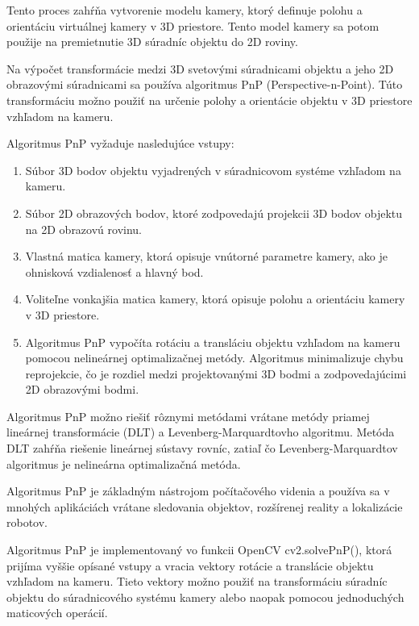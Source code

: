 {Tento proces zahŕňa vytvorenie modelu kamery, ktorý definuje polohu a orientáciu virtuálnej kamery v 3D priestore. Tento model kamery sa potom použije na premietnutie 3D súradníc objektu do 2D roviny.

Na výpočet transformácie medzi 3D svetovými súradnicami objektu a jeho 2D obrazovými súradnicami sa používa algoritmus PnP (Perspective-n-Point). Túto transformáciu možno použiť na určenie polohy a orientácie objektu v 3D priestore vzhľadom na kameru.

Algoritmus PnP vyžaduje nasledujúce vstupy:
\begin{enumerate}
\item Súbor 3D bodov objektu vyjadrených v súradnicovom systéme vzhľadom na kameru.
\item Súbor 2D obrazových bodov, ktoré zodpovedajú projekcii 3D bodov objektu na 2D obrazovú rovinu.
\item Vlastná matica kamery, ktorá opisuje vnútorné parametre kamery, ako je ohnisková vzdialenosť a hlavný bod.
\item Voliteľne vonkajšia matica kamery, ktorá opisuje polohu a orientáciu kamery v 3D priestore.
\item Algoritmus PnP vypočíta rotáciu a transláciu objektu vzhľadom na kameru pomocou nelineárnej optimalizačnej metódy. Algoritmus minimalizuje chybu reprojekcie, čo je rozdiel medzi projektovanými 3D bodmi a zodpovedajúcimi 2D obrazovými bodmi.
\end{enumerate}

Algoritmus PnP možno riešiť rôznymi metódami vrátane metódy priamej lineárnej transformácie (DLT) a Levenberg-Marquardtovho algoritmu. Metóda DLT zahŕňa riešenie lineárnej sústavy rovníc, zatiaľ čo Levenberg-Marquardtov algoritmus je nelineárna optimalizačná metóda.

Algoritmus PnP je základným nástrojom počítačového videnia a používa sa v mnohých aplikáciách vrátane sledovania objektov, rozšírenej reality a lokalizácie robotov.

Algoritmus PnP je implementovaný vo funkcii OpenCV cv2.solvePnP(), ktorá prijíma vyššie opísané vstupy a vracia vektory rotácie a translácie objektu vzhľadom na kameru. Tieto vektory možno použiť na transformáciu súradníc objektu do súradnicového systému kamery alebo naopak pomocou jednoduchých maticových operácií.

}
